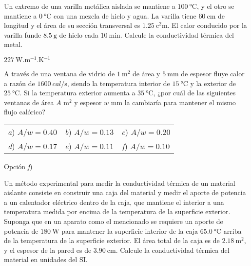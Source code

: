 \setcounter{figure}{0}
%
\begin{Exercise}
  {}{}
  Un extremo de una varilla metálica aislada se mantiene a $\SI{100}{\celsius}$, y el otro se mantiene a $\SI{0}{\celsius}$ con una mezcla de hielo y agua. La varilla tiene $\SI{60}{\centi\metre}$ de longitud y el área de su sección transversal es $\SI{1.25}{\square\centi\metre}$. El calor conducido por la varilla funde $\SI{8.5}{\gram}$ de hielo cada $\SI{10}{\minute}$. Calcule la conductividad térmica del metal.
\end{Exercise}
\begin{Answer}
  $\SI{227}{\watt.\metre^{-1}.\kelvin^{-1}}$
\end{Answer}
%
\begin{Exercise}
  A través de una ventana de vidrio de $\SI{1}{\square\metre}$ de área y $\SI{5}{\milli\metre}$ de espesor fluye calor a razón de $\SI{1600}{cal/\second}$, siendo la temperatura interior de $\SI{15}{\celsius}$ y la exterior de $\SI{25}{\celsius}$. Si la temperatura exterior aumenta a $\SI{35}{\celsius}$, ¿por cuál de las siguientes ventanas de área $A$ $\si{\square\metre}$ y espesor $w$ $\si{\milli\metre}$ la cambiaría para mantener el mismo flujo calórico?\\
\begin{tabular*}{0.8\textwidth}{ccc}
  \textit{a}) $A/w=0.40$ & \textit{b}) $A/w=0.13$ & \textit{c}) $A/w=0.20$\\
  \textit{d}) $A/w=0.17$ & \textit{e}) $A/w=0.11$ & \textit{f}) $A/w=0.10$\\
\end{tabular*}
\end{Exercise}
\begin{Answer}
  Opción \textit{f})
\end{Answer}
%
\begin{Exercise}
  Un método experimental para medir la conductividad térmica de un material aislante consiste en construir una caja del material y medir el aporte de potencia a un calentador eléctrico dentro de la caja, que mantiene el interior a una temperatura medida por encima de la temperatura de la superficie exterior. Suponga que en un aparato como el mencionado se requiere un aporte de potencia de $\SI{180}{\watt}$ para mantener la superficie interior de la caja $\SI{65.0}{\celsius}$ arriba de la temperatura de la superficie exterior. El área total de la caja es de $\SI{2.18}{\square\metre}$, y el espesor de la pared es de $\SI{3.90}{\centi\metre}$. Calcule la conductividad térmica del material en unidades del SI.
\end{Exercise}
